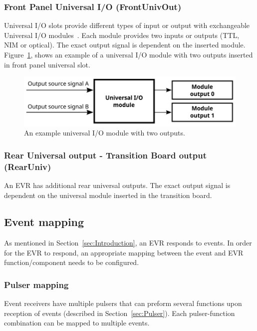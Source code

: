 \documentclass[12pt,a4paper]{article}
\begin{document}
\subsubsection{Front Panel Universal I/O (FrontUnivOut)}\label{sec:Front Panel Universal I/O}
Universal I/O slots provide different types of input or output with exchangeable Universal I/O modules~\cite{mrf}. Each module provides two inputs or outputs (TTL, NIM or optical). 
The exact output signal is dependent on the inserted module. Figure~\ref{fig:output_univ}, shows an example of a universal I/O module with two outputs inserted in front panel universal slot.
\begin{figure}[H]
	\centering
	\includegraphics[]{./img/univ}
	\caption{An example universal I/O module with two outputs.}
	\label{fig:output_univ}
\end{figure}

\subsubsection{Rear Universal output - Transition Board output (RearUniv)}\label{sec:Rear Universal output}
An EVR has additional rear universal outputs. The exact output signal is dependent on the universal module inserted in the transition board.

\subsection{Event mapping}\label{sec:Event mapping}
As mentioned in Section~\ref{sec:Introduction}, an EVR responds to events. In order for the EVR to respond, an appropriate mapping between the event and  EVR function/component needs to be configured.

\subsubsection{Pulser mapping}\label{sec:Pulser mapping}
Event receivers have multiple pulsers that can preform several functions upon reception of events (described in Section~\ref{sec:Pulser}). Each pulser-function combination can be
mapped to multiple events.
\end{document}
